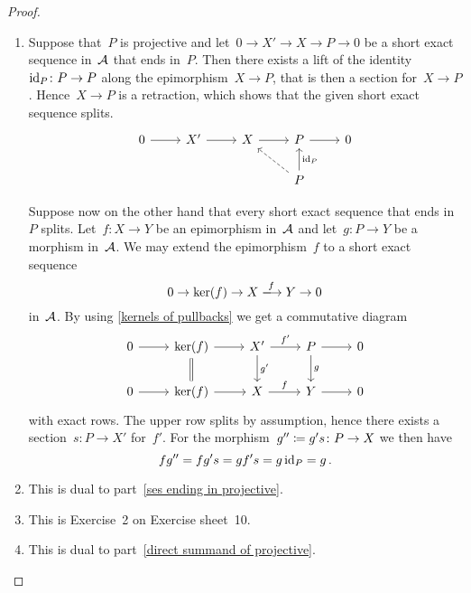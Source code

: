 \begin{proof}
  \leavevmode
  \begin{enumerate}
    \item
      Suppose that~$P$ is projective and let~$0 \to X' \to X \to P \to 0$ be a short exact sequence in~$\mathcal{A}$ that ends in~$P$.
      Then there exists a lift of the identity~$\operatorname{id}_P \colon P \to P$ along the epimorphism~$X \to P$, that is then a section for~$X \to P$.
      Hence~$X \to P$ is a retraction, which shows that the given short exact sequence splits.
      \[
        \begin{tikzcd}
            0
            \arrow{r}
          & X'
            \arrow{r}
          & X
            \arrow{r}
          & P
            \arrow{r}
          & 0
          \\
            {}
          & {}
          & {}
          & P
            \arrow{u}[right]{\id_P}
            \arrow[dashed]{ul}
          & {}
        \end{tikzcd}
      \]
      
      Suppose now on the other hand that every short exact sequence that ends in~$P$ splits.
      Let~$f \colon X \to Y$ be an epimorphism in~$\mathcal{A}$ and let~$g \colon P \to Y$ be a morphism in~$\mathcal{A}$.
      We may extend the epimorphism~$f$ to a short exact sequence
      \[
        0
        \to
        \ker(f)
        \to
        X
        \xlongto{f}
        Y
        \to
        0
      \]
      in~$\mathcal{A}$.
      By using \cref{kernels of pullbacks} we get a commutative diagram
      \[
        \begin{tikzcd}
            0
            \arrow{r}
          & \ker(f)
            \arrow{r}
            \arrow[equal]{d}
          & X'
            \arrow{r}[above]{f'}
            \arrow{d}[right]{g'}
          & P
            \arrow{r}
            \arrow{d}[right]{g}
          & 0
          \\
            0
            \arrow{r}
          & \ker(f)
            \arrow{r}
          & X
            \arrow{r}[above]{f}
          & Y
            \arrow{r}
          & 0
        \end{tikzcd}
      \]
      with exact rows.
      The upper row splits by assumption, hence there exists a section~$s \colon P \to X'$ for~$f'$.
      For the morphism~$g'' \coloneqq g's \colon P \to X$ we then have
      \[
          f g''
        = f g' s
        = g f' s
        = g \operatorname{id}_P
        = g \,.
      \]
    \item
      This is dual to part~\ref*{ses ending in projective}.
    \item
      This is Exercise~2 on Exercise sheet~10.
    \item
      This is dual to part~\ref*{direct summand of projective}.
    \qedhere
  \end{enumerate}
\end{proof}


